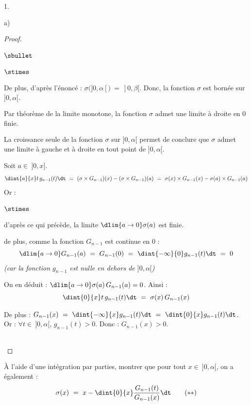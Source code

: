 \documentclass[11pt]{article}%
\begin{document}
\begin{noliste}{1.}
\begin{noliste}{a)}
\begin{proof}
\begin{noliste}{$\sbullet$}
\begin{liste}{$\stimes$}
	  \item De plus, d'après l'énoncé : $\sigma(]0,\alpha[) \ = \
	  ]0, \beta[$. Donc, la fonction $\sigma$ est bornée sur 
	  $]0,\alpha[$.
	\end{liste}
	\begin{noliste}{}
	  \item Par théorème de la limite monotone, la fonction 
	  $\sigma$ admet une limite à droite en $0$ finie.
	\end{noliste}
	
	\begin{remark}
	  La croissance seule de la fonction $\sigma$ sur 
	  $]0,\alpha[$ permet de conclure que $\sigma$ 
	  admet une limite à gauche et à droite en tout point de 
	  $]0,\alpha[$.
	\end{remark}
	
	
	\newpage
	
	
	Soit $a \in \ ]0,x]$.
	\[
	  \dint{a}{x} t \, g_{n-1}(t) \dt \ = \ (\sigma \times G_{n-1})
	  (x) - (\sigma \times G_{n-1})(a)
	  \ = \ \sigma(x) \times G_{n-1}(x) - \sigma(a) \times 
	  G_{n-1}(a)
	\]
	Or :
	\begin{noliste}{$\stimes$}
	  \item d'après ce qui précède, la limite $\dlim{a\to 0} 
	  \sigma(a)$ est finie.
	  \item de plus, comme la fonction $G_{n-1}$ est continue 
	  en $0$ : 
	  \[
	    \dlim{a \to 0} G_{n-1}(a) \ = \
	    G_{n-1}(0) \ = \ \dint{-\infty}{0} g_{n-1}(t)
	    \dt \ = \ 0 
	  \]
	  {\it (car la fonction $g_{n-1}$ est nulle en dehors 
	  de $]0,\alpha[$)}
	\end{noliste}
	On en déduit : $\dlim{a\to 0} \sigma(a) \, G_{n-1}(a)=0$. Ainsi 
	:
	\[
	  \dint{0}{x} t \, g_{n-1}(t) \dt \ = \ \sigma(x) \, G_{n-1}(x)
	\]

	
	\item De plus : $G_{n-1}(x) \ = \ \dint{-\infty}{x} g_{n-1}(t)
	\dt \ = \ \dint{0}{x} g_{n-1}(t) \dt$.\\[.1cm]
	Or : $\forall t \in \ ]0, \alpha[$, $g_{n-1}(t) >0$. Donc :
	$G_{n-1}(x) >0$.
      \end{noliste}
      \conc{D'où : $\forall x \in \ ]0,\alpha[$, $\sigma(x) = 
      \dfrac{1}{G_{n-1}(x)} \, \dint{0}{x} t \, g_{n-1}(t) 
      \dt$.}~\\[-1cm]
    \end{proof}
    
    \item À l'aide d'une intégration par parties, montrer que pour tout
    $x \in \ ]0,\alpha[$, on a également : 
    \[
      \sigma(x) \ = \ x - \dint{0}{x} \dfrac{G_{n-1}(t)}{G_{n-1}(x)}
      \dt \qquad (**)
    \]
    

\end{noliste}
\end{noliste}
\end{document}

